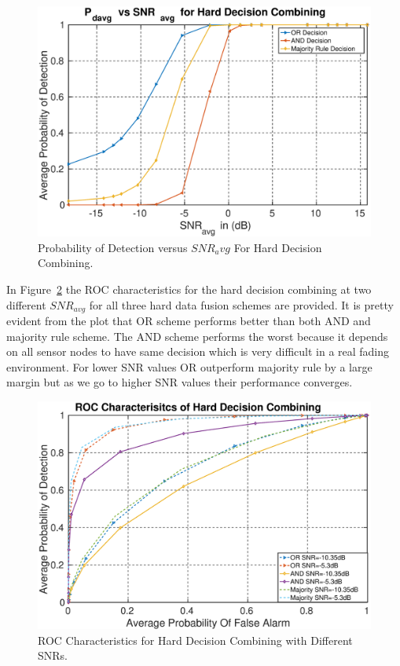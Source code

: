 \begin{figure}[ht!]
	\centering
	\includegraphics[width=\textwidth,keepaspectratio]{images/Gill/figs/hardecisionpd.eps}
    \caption{Probability of Detection versus $SNR_avg$ For Hard Decision Combining.} 
\label{hardres}      
\end{figure}
In Figure~\ref{hardroc} the ROC characteristics for the hard decision combining at two different $SNR_{avg}$ for all three hard data fusion schemes are provided. It is pretty evident from the plot that OR scheme performs better than both AND and majority rule scheme. The AND scheme performs the worst because it depends on all sensor nodes to have same decision which is very difficult in a real fading environment. For lower SNR values OR outperform majority rule by a large margin but as we go to higher SNR values their performance converges.

\begin{figure}[ht!]
	\centering
	\includegraphics[width=\textwidth,keepaspectratio]{images/Gill/figs/hardecisioroc.eps}
    \caption{ROC Characteristics for Hard Decision Combining with Different SNRs.} 
\label{hardroc}      
\end{figure}

